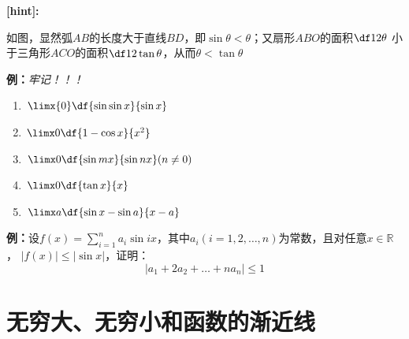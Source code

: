 {\bf [hint]:}
\begin{center}
\end{center}

如图，显然弧$AB$的长度大于直线$BD$，即$\sin\theta<\theta$；又扇形$ABO$的面积$\df12\theta$
小于三角形$ACO$的面积$\df12\tan\theta$，从而$\theta<\tan\theta$

{\bf 例：}{\it 牢记！！！}
\begin{enumerate}[(1)]
  \setlength{\itemindent}{1cm}
  \item $\limx{0}\df{\sin\sin x}{\sin x}$ 
  \item $\limx 0\df{1-\cos x}{x^2}$ 
  \item $\limx 0\df{\sin mx}{\sin nx}(n\ne 0)$
  \item $\limx 0\df{\tan x}{x}$
  \item $\limx a\df{\sin x-\sin a}{x-a}$
\end{enumerate}

{\bf 例：}设$f(x)=\sum\limits_{i=1}^na_i\sin
ix$，其中$a_i(i=1,2,\ldots,n)$为常数，且对任意$x\in\mathbb{R}$， $|f(x)|\leq |\sin x|$，证明：
$$\left|a_1+2a_2+\ldots+na_n\right|\leq 1$$

\section{无穷大、无穷小和函数的渐近线}

